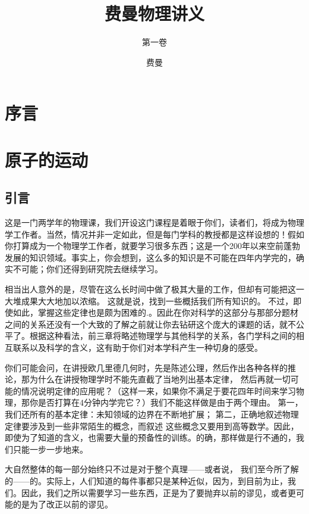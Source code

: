 \documentclass[12pt,oneside]{book}
\title{费曼物理讲义}
\subtitle{第一卷}
\author{费曼}
\begin{document}
\makemytitle



\frontmatter 
{}
\chapter*{序言}


\setcounter{tocdepth}{2}    
\tableofcontents



\mainmatter

\chapter{原子的运动}

\section{引言}
这是一门两学年的物理课，我们开设这门课程是着眼于你们，读者们，将成为物理学工作者。当然，情况并非一定如此，但是每门学科的教授都是这样设想的！假如你打算成为一个物理学工作者，就要学习很多东西；这是一个200年以来空前蓬勃发展的知识领域。事实上，你会想到，这么多的知识是不可能在四年内学完的，确实不可能；你们还得到研究院去继续学习。

相当出人意外的是，尽管在这么长时间中做了极其大量的工作，但却有可能把这一大堆成果大大地加以浓缩。 这就是说，找到一些概括我们所有知识的。 不过，即使如此，掌握这些定律也是颇为困难的.。因此在你对科学的这部分与那部分题材之间的关系还没有一个大致的了解之前就让你去钻研这个庞大的课题的话，就不公平了。根据这种看法，前三章将略述物理学与其他科学的关系，各门学科之间的相互联系以及科学的含义，这有助于你们对本学科产生一种切身的感受。

你们可能会问，在讲授欧几里德几何时，先是陈述公理，然后作出各种各样的推论，那为什么在讲授物理学时不能先直截了当地列出基本定律， 然后再就一切可能的情况说明定律的应用呢？（这样一来，如果你不满足于要花四年时间来学习物理，那你是否打算在4分钟内学完它？）我们不能这样做是由于两个理由。 第一，我们还所有的基本定律：未知领域的边界在不断地扩展； 第二，正确地叙述物理定律要涉及到一些非常陌生的概念，而叙述
这些概念又要用到高等数学。因此，即使为了知道的含义，也需要大量的预备性的训练。的确，那样做是行不通的，我们只能一步一步地来。

大自然整体的每一部分始终只不过是对于整个真理——或者说， 我们至今所了解的——的。实际上，人们知道的每件事都只是某种近似，因为，到目前为止，我们。因此，我们之所以需要学习一些东西，正是为了要抛弃以前的谬见，或者更可能的是为了改正以前的谬见。
\end{document}
